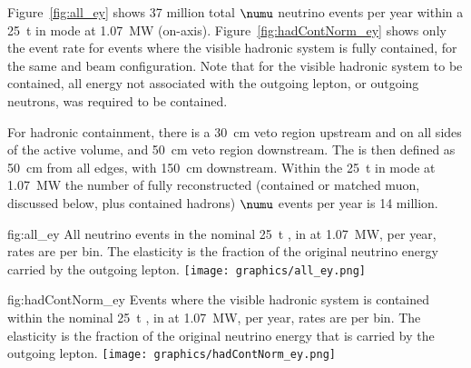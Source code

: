 \label{sec:appx-nd::rates}

Figure~\ref{fig:all_ey} shows 37 million total  $\numu$ neutrino events per year within a \SI{25}{\tonne}  in  mode at \SI{1.07}{\mega\watt} (on-axis). Figure~\ref{fig:hadContNorm_ey} shows only the event rate for events where the visible hadronic system is fully contained, for the same  and beam configuration. Note that for the visible hadronic system to be contained, all energy not associated with the outgoing lepton, or outgoing neutrons, was required to be contained. 


For hadronic containment, there is a \SI{30}{\centi\metre} veto region upstream and on all sides of the active volume, and \SI{50}{\centi\metre} veto region downstream. The  is then defined as \SI{50}{\centi\metre} from all edges, with \SI{150}{\centi\metre} downstream.  Within the \SI{25}{\tonne}  in  mode at \SI{1.07}{\mega\watt} the number of fully reconstructed (contained or matched muon, discussed below, plus contained hadrons)  $\numu$ events per year is 14 million.   

\begin{dunefigure}{fig:all_ey}
{All neutrino events in the nominal \SI{25}{\tonne} , in  at \SI{1.07}{\mega\watt}, per year, rates are per bin. The elasticity is the fraction of the original neutrino energy carried by the outgoing lepton.}
	\texttt{[image: graphics/all\_ey.png]}
\end{dunefigure}

\begin{dunefigure}{fig:hadContNorm_ey}
{Events where the visible hadronic system is contained within the nominal \SI{25}{\tonne} , in  at \SI{1.07}{\mega\watt}, per year, rates are per bin.  The elasticity is the fraction of the original neutrino energy that is carried by the outgoing lepton.}
	\texttt{[image: graphics/hadContNorm\_ey.png]}
\end{dunefigure}

